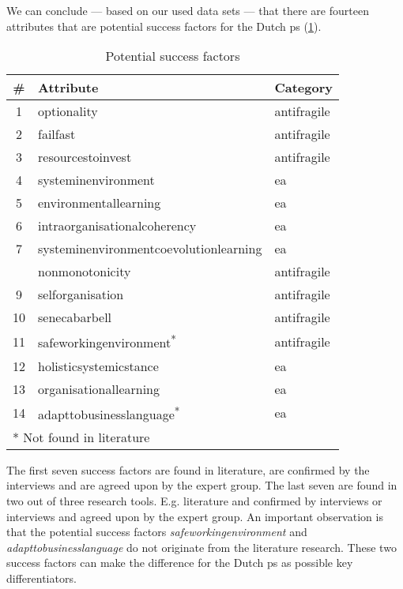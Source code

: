 We can conclude --- based on our used data sets --- that there are fourteen \glspl{attribute} that are potential success factors for the Dutch \gls{ps} (\cref{tab:identifiedsuccessfactors}). 
\begin{table}[H]
	\centering
	\begin{tabular}{@{}cll@{}}
		\toprule
		\textbf{\#} & \textbf{Attribute} & \textbf{Category} \\%
		\midrule
		1 & \Gls{optionality} & \Gls{antifragile} \\%
		2 & \Gls{failfast} & \Gls{antifragile} \\%
		3 & \Gls{resourcestoinvest} & \Gls{antifragile} \\%
		4 & \Gls{systeminenvironment} & \gls{ea} \\%
		5 & \Gls{environmentallearning} & \gls{ea} \\%
		6 & \Gls{intraorganisationalcoherency} & \gls{ea} \\%
		7 & \Gls{systeminenvironmentcoevolutionlearning} & \gls{ea} \\%
		\hdashline %
		8 & \Gls{nonmonotonicity} & \Gls{antifragile}  \\%
		9 & \Gls{selforganisation} & \Gls{antifragile}  \\%
		10 & \Gls{senecabarbell} & \Gls{antifragile}  \\%
		11 & \Gls{safeworkingenvironment}\textsuperscript{*} & \Gls{antifragile}  \\%
		12 & \Gls{holisticsystemicstance} & \gls{ea}  \\%
		13 & \Gls{organisationallearning} & \gls{ea}  \\%
		14 & \Gls{adapttobusinesslanguage}\textsuperscript{*} & \gls{ea}  \\%
		\bottomrule
		\multicolumn{2}{l}{* Not found in literature}
	\end{tabular}%
	\caption[Potential success factors]{Potential success factors}
	\label{tab:identifiedsuccessfactors}%
\end{table}%
The first seven success factors are found in literature, are confirmed by the interviews and are agreed upon by the expert group. The last seven are found in two out of three research tools. E.g. literature and confirmed by interviews or interviews and agreed upon by the expert group. An important observation is that the potential success factors \textit{\gls{safeworkingenvironment}} and \textit{\gls{adapttobusinesslanguage}} do not originate from the literature research. These two success factors can make the difference for the Dutch \gls{ps} as possible key differentiators.

